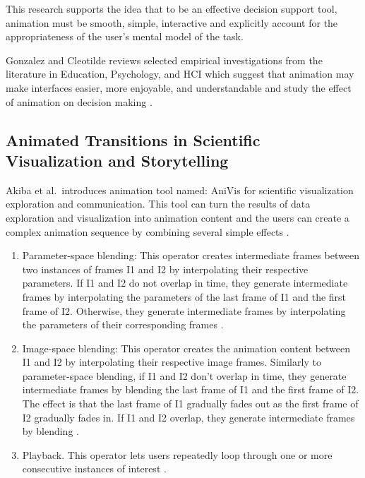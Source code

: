\documentclass{egpubl}
\begin{document}
This research supports the idea that to be an effective decision support tool, animation must be smooth, simple, interactive and explicitly account for the appropriateness of the user's mental model of the task.

Gonzalez and Cleotilde reviews selected empirical investigations from the literature in Education, Psychology, and HCI which suggest that animation may make interfaces easier, more enjoyable, and understandable and study the effect of animation on decision making \cite{gonzalez1996does}.


\subsection{Animated Transitions in Scientific Visualization and Storytelling}
Akiba et al.\ introduces animation tool named: AniVis for scientific visualization exploration and communication. This tool can turn the results of data exploration and visualization into animation content and the users can create a complex animation sequence by combining several simple effects \cite{Akiba}.
\begin{enumerate}
\item Parameter-space blending: This operator creates intermediate frames between two instances of frames I1 and I2 by interpolating their respective parameters. If I1 and I2 do not overlap in time, they generate intermediate frames by interpolating the parameters of the last frame of I1 and the first frame of I2. Otherwise, they generate intermediate frames by interpolating the parameters of their corresponding frames \cite{Akiba}.

\item Image-space blending: This operator creates the animation content between I1 and I2 by interpolating their respective image frames. Similarly to parameter-space blending, if I1 and I2 don't overlap in time, they generate intermediate frames by blending the last frame of I1 and the first frame of I2. The effect is that the last frame of I1 gradually fades out as the first frame of I2 gradually fades in. If I1 and I2 overlap, they generate intermediate frames by blending \cite{Akiba}.

\item Playback. This operator lets users repeatedly loop through one or more consecutive instances of interest \cite{Akiba}.

\end{enumerate}
\end{document}

